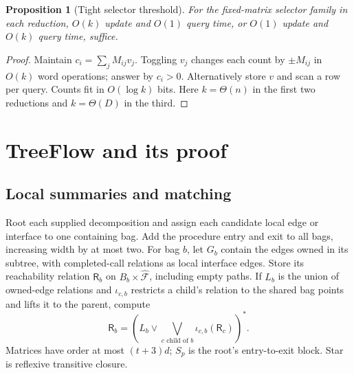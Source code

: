 \documentclass[11pt,letterpaper]{article}
\newtheorem{proposition}[theorem]{Proposition}
\theoremstyle{definition}
\newcommand{\Rel}{\mathsf R}
\begin{document}


\begin{proposition}[Tight selector threshold]\label{prop:tight}
For the fixed-matrix selector family in each reduction, $O(k)$ update
and $O(1)$ query time, or $O(1)$ update and $O(k)$ query time, suffice.
\end{proposition}
\begin{proof}
Maintain $c_i=\sum_jM_{ij}v_j$. Toggling $v_j$ changes each count by
$\pm M_{ij}$ in $O(k)$ word operations; answer by $c_i>0$.
Alternatively store $v$ and scan a row per query. Counts fit in
$O(\log k)$ bits. Here $k=\Theta(n)$ in the first two reductions
and $k=\Theta(D)$ in the third.
\end{proof}

\section{TreeFlow and its proof}\label{sec:algorithm}
\subsection{Local summaries and matching}
Root each supplied decomposition and assign each candidate local edge
or interface to one containing bag. Add the procedure entry and exit to
all bags, increasing width by at most two. For bag $b$, let $G_b$ contain
the edges owned in its subtree, with completed-call relations as local
interface edges. Store its reachability relation $\Rel_b$ on
$B_b\times\widehat{\mathcal F}$, including empty paths. If $L_b$ is
the union of owned-edge relations and $\iota_{c,b}$ restricts a child's
relation to the shared bag points and lifts it to the parent, compute
\begin{equation}\label{eq:bag}
 \Rel_b=\left(L_b\vee\bigvee_{c\text{ child of }b}
                \iota_{c,b}(\Rel_c)\right)^*.
\end{equation}
Matrices have order at most $(t+3)d$; $S_p$ is the root's
entry-to-exit block. Star is reflexive transitive closure.
\end{document}
